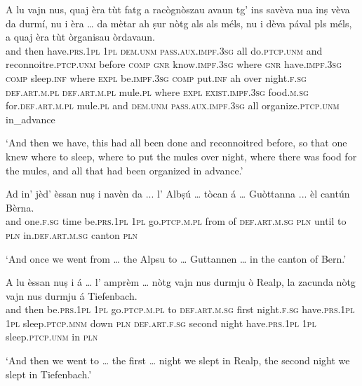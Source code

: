 \begin{linenumbers}
\gll A lu vajn nus, quaj èra tùt fatg a racògnòszau avaun tg’ ins savèva nua inṣ vèva da durmí, nu i èra … da mètar ah ṣur nòtg als als méls, nu i dèva pával pls méls, a quaj èra tùt òrganisau òrdavaun. \\
and then have.\textsc{prs.1pl} \textsc{1pl} \textsc{dem.unm} \textsc{pass.aux.impf.3sg} all do.\textsc{ptcp.unm} and  reconnoitre.\textsc{ptcp.unm} before \textsc{comp} \textsc{gnr}  know.\textsc{impf.3sg} where \textsc{gnr} have.\textsc{impf.3sg} \textsc{comp} sleep.\textsc{inf} where \textsc{expl} be.\textsc{impf.3sg} {} \textsc{comp} put.\textsc{inf} ah over night.\textsc{f.sg} \textsc{def.art.m.pl} \textsc{def.art.m.pl} mule.\textsc{pl} where \textsc{expl} \textsc{exist.impf.3sg} food.\textsc{m.sg} for.\textsc{def.art.m.pl} mule.\textsc{pl} and \textsc{dem.unm} \textsc{pass.aux.impf.3sg} all organize.\textsc{ptcp.unm} in\_advance \\
\end{linenumbers}
\medskip
\glt `And then we have, this had all been done and reconnoitred before, so that one knew where to sleep, where to put the mules over night, where there was food for the mules, and all that had been organized in advance.'
\medskip

\begin{linenumbers}
\gll  Ad in’ jèd’ èssan nuṣ i navèn da ... l’ Albṣú … tòcan á … Guòttanna ... èl\footnotemark{} cantún Bèrna.  \\
and one.\textsc{f.sg} time be.\textsc{prs.1pl} \textsc{1pl} go.\textsc{ptcp.m.pl} from of {} \textsc{def.art.m.sg} \textsc{pln} {} until to {} \textsc{pln} {} in.\textsc{def.art.m.sg} canton \textsc{pln}\\
\end{linenumbers}
\medskip
\glt `And once we went from … the Alpsu to … Guttannen … in the canton of Bern.'
\medskip

\begin{linenumbers}
\gll  A lu èssan nuṣ i á … l’ amprèm … nòtg vajn nus durmju ò Realp, la zacunda nòtg vajn nus durmju á Tiefenbach.  \\
and then be.\textsc{prs.1pl} \textsc{1pl} go.\textsc{ptcp.m.pl} to {} \textsc{def.art.m.sg} first {} night.\textsc{f.sg} have.\textsc{prs.1pl} \textsc{1pl} sleep.\textsc{ptcp.mnm} down \textsc{pln} \textsc{def.art.f.sg} second night have.\textsc{prs.1pl} \textsc{1pl}  sleep.\textsc{ptcp.unm} in \textsc{pln}\\
\end{linenumbers}
\medskip
\glt `And then we went to … the first … night we slept in Realp, the second night we slept in Tiefenbach.'
\medskip

